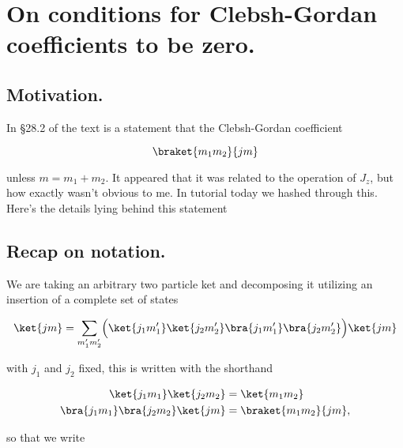 
%

\chapter{On conditions for Clebsh-Gordan coefficients to be zero.}
\label{chap:ClebshGordan}
{}
\date{Nov 23, 2011}

\beginArtWithToc

\section{Motivation.}

In \S 28.2 of the text \cite{desai2009quantum} is a statement that the Clebsh-Gordan coefficient

\begin{equation}\label{eqn:ClebshGordan:10}
\braket{m_1 m_2}{jm}
\end{equation}

unless $m = m_1 + m_2$.  It appeared that it was related to the operation of $J_z$, but how exactly wasn't obvious to me.  In tutorial today we hashed through this.  Here's the details lying behind this statement

\section{Recap on notation.}

We are taking an arbitrary two particle ket and decomposing it utilizing an insertion of a complete set of states

\begin{equation}\label{eqn:ClebshGordan:30}
\ket{jm} = \sum_{m_1' m_2'} 
\Bigl(
\ket{j_1 m_1'} \ket{j_2 m_2'}
\bra{j_1 m_1'} \bra{j_2 m_2'}
\Bigr)
\ket{jm}
\end{equation}

with $j_1$ and $j_2$ fixed, this is written with the shorthand

\begin{align}\label{eqn:ClebshGordan:50}
\ket{j_1 m_1} \ket{j_2 m_2} &= \ket{m_1 m_2} \\
\bra{j_1 m_1} \bra{j_2 m_2} \ket{jm} &= \braket{m_1 m_2}{jm},
\end{align}

so that we write

